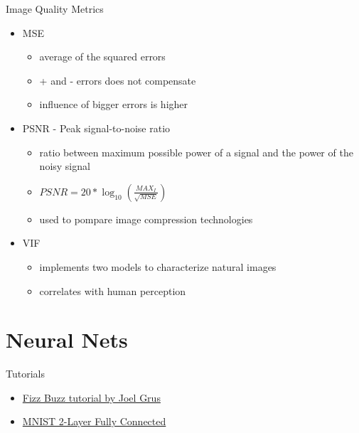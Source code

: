 \documentclass[11pt,aspectratio=169]{beamer}
\begin{document}
\begin{frame}{Image Quality Metrics}
  \begin{itemize}
    \item MSE
    \begin{itemize}
      \item average of the squared errors
      \item + and - errors does not compensate
      \item influence of bigger errors is higher
    \end{itemize}
    \item PSNR - Peak signal-to-noise ratio
    \begin{itemize}
      \item ratio between maximum possible power of a signal and the power of the noisy signal 
      \item \( PSNR = 20 * \log_{10} \left( \frac {MAX_I}  {\sqrt{MSE}} \right) \)
      \item used to pompare image compression technologies
    \end{itemize}
    \item VIF
    \begin{itemize}
      \item implements two models to characterize natural images
      \item correlates with human perception
    \end{itemize}
  \end{itemize}
\end{frame}

\section{Neural Nets}

\begin{frame}{Tutorials}
  \begin{itemize}
    \item \href{http://joelgrus.com/2016/05/23/fizz-buzz-in-tensorflow/}{Fizz Buzz tutorial by Joel Grus}
    \item \href{https://github.com/aymericdamien/TensorFlow-Examples/blob/master/examples/3_NeuralNetworks/neural_network_raw.py}{MNIST 2-Layer Fully Connected}
  \end{itemize}
\end{frame}


\appendix
\end{document}
